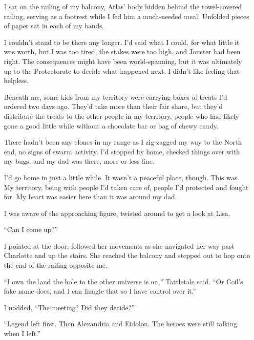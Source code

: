 I sat on the railing of my balcony, Atlas' body hidden behind the towel-covered railing, serving as a footrest while I fed him a much-needed meal.  Unfolded pieces of paper sat in each of my hands.



I couldn't stand to be there any longer.  I'd said what I could, for what little it was worth, but I was too tired, the stakes were too high, and Jouster had been right.  The consequences might have been world-spanning, but it was ultimately up to the Protectorate to decide what happened next.  I didn't like feeling that helpless.



Beneath me, some kids from my territory were carrying boxes of treats I'd ordered two days ago.  They'd take more than their fair share, but they'd distribute the treats to the other people in my territory, people who had likely gone a good little while without a chocolate bar or bag of chewy candy.



There hadn't been any clones in my range as I zig-zagged my way to the North end, no signs of swarm activity.  I'd stopped by home, checked things over with my bugs, and my dad was there, more or less fine.



I'd go home in just a little while.  It wasn't a peaceful place, though.  This was.  My territory, being with people I'd taken care of, people I'd protected and fought for.  My heart was easier here than it was around my dad.



I was aware of the approaching figure, twisted around to get a look at Lisa.



``Can I come up?''



I pointed at the door, followed her movements as she navigated her way past Charlotte and up the stairs.  She reached the balcony and stepped out to hop onto the end of the railing opposite me.



``I own the land the hole to the other universe is on,'' Tattletale said.  ``Or Coil's fake name does, and I can finagle that so I have control over it.''



I nodded.  ``The meeting?  Did they decide?''



``Legend left first.  Then Alexandria and Eidolon.  The heroes were still talking when I left.''



